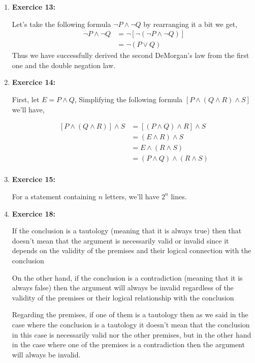 \documentclass{article} %
\begin{document}
\begin{enumerate}
\begin{itemize}
    \end{itemize}

    \item \textbf{Exercice 13:}

    Let's take the following formula $\neg P \land \neg Q$ by rearranging it a bit we get,
    \begin{equation*}
        \begin{split}
            \neg P \land \neg Q & = \neg [\neg (\neg P \land \neg Q)] \\
            & = \neg (P \lor Q)
        \end{split}
    \end{equation*}
    Thus we have successfully derived the second DeMorgan's law from the first one and the double negation law.

    \item \textbf{Exercice 14:}

    First, let $E = P \land Q$, Simplifying the following formula $[P \land (Q \land R) \land S]$ we'll have, 

    \begin{equation*}
        \begin{split}
            [P \land (Q \land R)] \land S & = [(P \land Q) \land R] \land S \\
            & = (E \land R) \land S \\
            & = E \land (R \land S) \\
            & = (P \land Q) \land (R \land S) \\
        \end{split}
    \end{equation*}

    \item \textbf{Exercice 15:}

    For a statement containing $n$ letters, we'll have $2^{n}$ lines.

    \item \textbf{Exercice 18:}

    If the conclusion is a tautology (meaning that it is always true) then that doesn't mean that the argument is necessarily valid or invalid since it depends on the validity of the premises and their logical connection with the conclusion

    On the other hand, if the conclusion is a contradiction (meaning that it is always false) then the argument will always be invalid regardless of the validity of the premises or their logical relationship with the conclusion

    Regarding the premises, if one of them is a tautology then as we said in the case where the conclusion is a tautology it doesn't mean that the conclusion in this case is necessarily valid nor the other premises, but in the other hand in the case where one of the premises is a contradiction then the argument will always be invalid.
    
    \end{enumerate}
\end{document}
